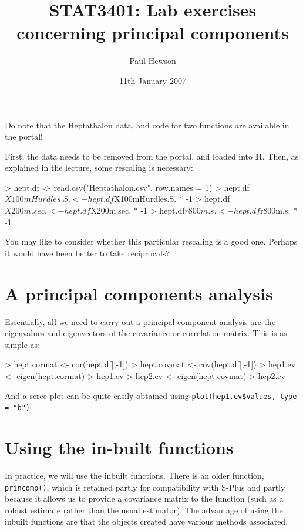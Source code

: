 \documentclass[11pt]{article}
\title{STAT3401: Lab exercises concerning principal components}
\author{Paul Hewson}
\date{11th January 2007}
\begin{document}
\setlength{\parindent}{0pt}
\setlength{\parskip}{12pt}
\sffamily
\maketitle




Do note that the Heptathalon data, and code for two functions are available in the portal!

First, the data needs to be removed from the portal, and loaded into \textbf{R}.   Then, as explained in the lecture, some rescaling is necessary:


\begin{Schunk}
\begin{Sinput}
> hept.df <- read.csv("Heptathalon.csv", row.names = 1)
> hept.df$X100mHurdles.S. <- hept.df$X100mHurdles.S. * -1
> hept.df$X200m.sec. <- hept.df$X200m.sec. * -1
> hept.df$r800m.s. <- hept.df$r800m.s. * -1
\end{Sinput}
\end{Schunk}

You may like to consider whether this particular rescaling is a good one.   Perhaps it would have been better to take reciprocals?


\section{A principal components analysis}

Essentially, all we need to carry out a principal component analysis are the eigenvalues and eigenvectors of the covariance or correlation matrix.   This is as simple as:

\begin{Schunk}
\begin{Sinput}
> hept.cormat <- cor(hept.df[,-1])
> hept.covmat <- cov(hept.df[,-1])
> hep1.ev <- eigen(hept.cormat)
> hep1.ev
> hep2.ev <- eigen(hept.covmat)
> hep2.ev
\end{Sinput}
\end{Schunk}

And a scree plot can be quite easily obtained using \verb+plot(hep1.ev$values, type = "b")+


\section{Using the in-built functions}

In practice, we will use the inbuilt functions.   There is an older function, \texttt{princomp()}, which is retained partly for compatibility with S-Plus and partly because it allows us to provide a covariance matrix to the function (such as a robust estimate rather than the usual estimator).   The advantage of using the inbuilt functions are that the objects created have various methods associated.
\end{document}
